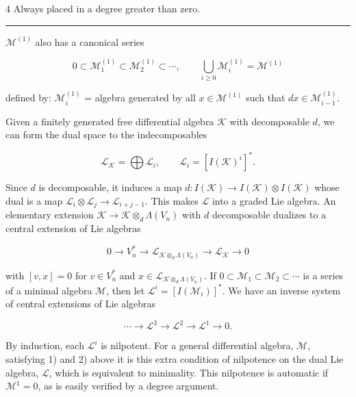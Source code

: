 \documentclass[
  english,
  a3paper,
  a3paper]{extarticle}
\begin{document}
4 Always placed in a degree greater than zero.

\clearpage



\par

\vspace{0.7mm}\hrule\vspace{1.6mm}

\fontsize{9}{11}\selectfont

\(\mathcal M^{(1)}\) also has a canonical series

\[
0\subset\mathcal M_1^{(1)}\subset\mathcal M_2^{(1)}\subset\cdots,\qquad \bigcup_{i\ge0}\mathcal M_i^{(1)}=\mathcal M^{(1)}
\]

defined by: \(\mathcal M_i^{(1)}\) = algebra generated by all
\(x\in\mathcal M^{(1)}\) such that \(dx\in\mathcal M_{i-1}^{(1)}\).

Given a finitely generated free differential algebra \(\mathcal K\) with
decomposable \(d\), we can form the dual space to the indecomposables

\[
\mathcal L_{\mathcal K}=\bigoplus\mathcal L_i,\qquad \mathcal L_i=[I(\mathcal K)^i]^*.
\]

Since \(d\) is decomposable, it induces a map
\(d:I(\mathcal K)\to I(\mathcal K)\otimes I(\mathcal K)\) whose dual is
a map \(\mathcal L_i\otimes\mathcal L_j\to\mathcal L_{i+j-1}\). This
makes \(\mathcal L\) into a graded Lie algebra. An elementary extension
\(\mathcal K\to\mathcal K\otimes_d\Lambda(V_n)\) with \(d\) decomposable
dualizes to a central extension of Lie algebras

\[
0\to V_n^*\to\mathcal L_{\mathcal K\otimes_d\Lambda(V_n)}\to\mathcal L_{\mathcal K}\to0
\]

with \([v,x]=0\) for \(v\in V_n^*\) and
\(x\in\mathcal L_{\mathcal K\otimes_d\Lambda(V_n)}\). If
\(0\subset\mathcal M_1\subset\mathcal M_2\subset\cdots\) is a series of
a minimal algebra \(\mathcal M\), then let
\(\mathcal L^i=[I(\mathcal M_i)]^*\). We have an inverse system of
central extensions of Lie algebras

\[
\cdots\to\mathcal L^3\to\mathcal L^2\to\mathcal L^1\to0.
\]

By induction, each \(\mathcal L^i\) is nilpotent. For a general
differential algebra, \(\mathcal M\), satisfying 1) and 2) above it is
this extra condition of nilpotence on the dual Lie algebra,
\(\mathcal L\), which is equivalent to minimality. This nilpotence is
automatic if \(\mathcal M^1=0\), as is easily verified by a degree
argument.
\end{document}

